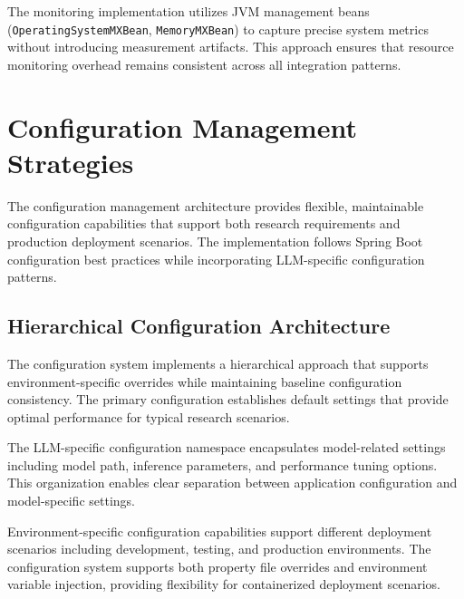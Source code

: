 
The monitoring implementation utilizes JVM management beans (\texttt{OperatingSystemMXBean}, \texttt{MemoryMXBean}) to capture precise system metrics without introducing measurement artifacts. This approach ensures that resource monitoring overhead remains consistent across all integration patterns.


\section{Configuration Management Strategies}

The configuration management architecture provides flexible, maintainable configuration capabilities that support both research requirements and production deployment scenarios. The implementation follows Spring Boot configuration best practices while incorporating LLM-specific configuration patterns.

\subsection{Hierarchical Configuration Architecture}

The configuration system implements a hierarchical approach that supports environment-specific overrides while maintaining baseline configuration consistency. The primary configuration establishes default settings that provide optimal performance for typical research scenarios.


The LLM-specific configuration namespace encapsulates model-related settings including model path, inference parameters, and performance tuning options. This organization enables clear separation between application configuration and model-specific settings.


Environment-specific configuration capabilities support different deployment scenarios including development, testing, and production environments. The configuration system supports both property file overrides and environment variable injection, providing flexibility for containerized deployment scenarios.

